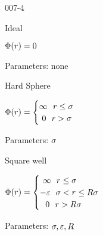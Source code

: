 \begin{mitframe}{007-4} %

    
	\begin{listone}
    
    	\item Ideal
    
    	\begin{listtwo}
    
    		\item $\pot(\pos) = 0 $
    
    		\item Parameters: none
    
   		\end{listtwo}
    
    	\item Hard Sphere
    
   		\begin{listtwo}

    		\item $\pot(\pos)=\begin{cases}
                    \infty ~~\pos \leq \molecrad\\
                    ~0 ~~ \pos > \molecrad\\
                	\end{cases}$

      		\item Parameters: $\molecrad$
    
    	\end{listtwo}
    
    	\item Square well
    
    	\begin{listtwo}
    
    		\item $\pot(\pos)=\begin{cases}
                    ~\infty ~~\pos \leq \molecrad\\
                    -\partpoten ~~\molecrad < \pos \leq \gasconst\molecrad\\
                    ~~0 ~~ \pos > \gasconst\molecrad\\
                \end{cases}$
                
      		\item Parameters: $\molecrad, \partpoten, \gasconst$

        

\end{listtwo}
\end{listone}
\end{mitframe}
